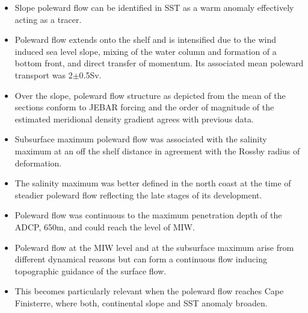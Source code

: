 \begin{itemize}
\item Slope poleward flow can be identified in SST as a warm anomaly
effectively acting as a tracer.
\item Poleward flow extends onto the shelf and is intensified due to the wind induced sea
level slope, mixing of the water column and formation of a bottom
front, and direct transfer of momentum. Its associated mean
poleward transport was 2$\pm$0.5Sv.
\item Over the slope, poleward flow structure as depicted from the mean
of the sections conform to JEBAR forcing and the order of
magnitude of the estimated meridional density gradient agrees with
previous data.
\item Subsurface maximum poleward flow was associated
with the salinity maximum at an off the shelf distance in
agreement with the Rossby radius of deformation.
\item The salinity maximum was better defined in the north coast at the
time of steadier poleward flow reflecting the late stages of its
development.
\item Poleward flow was continuous to the maximum penetration depth of the
ADCP, 650m, and could reach the level of MIW.
\item Poleward flow at the MIW level and at the subsurface maximum arise from different
dynamical reasons but can form a continuous flow inducing
topographic guidance of the surface flow.
\item This becomes particularly relevant when the poleward flow reaches
Cape Finisterre, where both, continental slope and SST anomaly
broaden.
\end{itemize}


